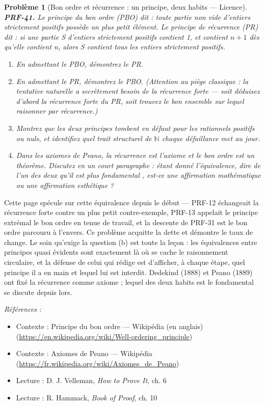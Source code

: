 \documentclass[11pt]{article}
\newtheorem{problem}{Problème}
\newenvironment{refs}{\par\small\noindent\emph{Références :}\begin{itemize}\setlength\itemsep{0pt}}{\end{itemize}\normalsize}
\begin{document}
\bigskip

\begin{problem}[{Bon ordre et récurrence : un principe, deux habits --- Licence}]
\textbf{PRF-41.} Le principe du bon ordre (PBO) dit : toute partie non vide d'entiers
strictement positifs possède un plus petit élément. Le principe de récurrence (PR) dit : si
une partie S d'entiers strictement positifs contient 1, et contient $ n+1 $ dès qu'elle
contient n, alors S contient tous les entiers strictement positifs.
\begin{enumerate}
\item[(a)] En admettant le PBO, démontrez le PR.
\item[(b)] En admettant le PR, démontrez le PBO. (Attention au piège classique : la tentative
naturelle a secrètement besoin de la récurrence forte --- soit déduisez d'abord la récurrence
forte du PR, soit trouvez le bon ensemble sur lequel raisonner par récurrence.)
\item[(c)] Montrez que les deux principes tombent en défaut pour les rationnels positifs ou nuls,
et identifiez quel trait structurel de $\mathbb{N}$ chaque défaillance met au jour.
\item[(d)] Dans les axiomes de Peano, la récurrence est l'axiome et le bon ordre est un théorème.
Discutez en un court paragraphe : étant donné l'équivalence, dire de l'un des deux qu'il est
\og{} plus fondamental \fg{}, est-ce une affirmation mathématique ou une affirmation
esthétique ?
\end{enumerate}

\end{problem}

\noindent Cette page spécule sur cette équivalence depuis le début --- PRF-12
échangeait la récurrence forte contre un plus petit contre-exemple, PRF-13 appelait le
principe extrémal le bon ordre en tenue de travail, et la descente de PRF-31 est le bon ordre
parcouru à l'envers. Ce problème acquitte la dette et démontre le taux de change. Le soin
qu'exige la question (b) est toute la leçon : les équivalences entre principes quasi évidents
sont exactement là où se cache le raisonnement circulaire, et la défense de celui qui rédige
est d'afficher, à chaque étape, quel principe il a en main et lequel lui est interdit.
Dedekind (1888) et Peano (1889) ont fixé la récurrence comme axiome ; lequel des deux habits
est le \og{} fondamental \fg{} se discute depuis lors.

\begin{refs}
\item Contexte : Principe du bon ordre --- Wikipédia (en anglais) (\url{https://en.wikipedia.org/wiki/Well-ordering_principle})
\item Contexte : Axiomes de Peano --- Wikipédia (\url{https://fr.wikipedia.org/wiki/Axiomes_de_Peano})
\item Lecture : D. J. Velleman, \textit{How to Prove It}, ch. 6
\item Lecture : R. Hammack, \textit{Book of Proof}, ch. 10
\end{refs}
\end{document}
